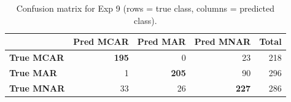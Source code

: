 \begin{table}[htbp]
\centering
\caption{Confusion matrix for Exp 9 (rows = true class, columns = predicted class).}
\label{tab:cm-exp-9}
\begin{tabular}{l|rrr|r}
\toprule
 & \textbf{Pred MCAR} & \textbf{Pred MAR} & \textbf{Pred MNAR} & \textbf{Total} \\
\midrule
\textbf{True MCAR} & \textbf{195} & 0 & 23 & 218 \\
\textbf{True MAR} & 1 & \textbf{205} & 90 & 296 \\
\textbf{True MNAR} & 33 & 26 & \textbf{227} & 286 \\
\bottomrule
\end{tabular}
\end{table}